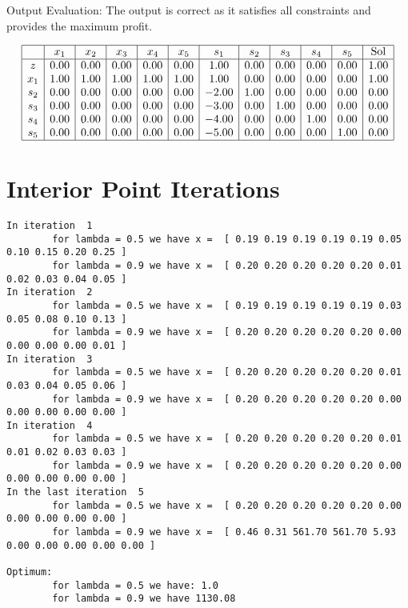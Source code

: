 \documentclass[12pt, legalpaper]{exam}
\begin{document}
Output Evaluation:
The output is correct as it satisfies all constraints and provides the maximum profit.
 
\[
\begin{array}{|c|c|c|c|c|c|c|c|c|c|c|c|}
\hline
    & x_1 & x_2 & x_3 & x_4 & x_5 & s_1 & s_2 & s_3 & s_4 & s_5 & \text{Sol} \\
\hline
z   & 0.00 & 0.00 & 0.00 & 0.00 & 0.00 & 1.00 & 0.00 & 0.00 & 0.00 & 0.00 & 1.00 \\
x_1 & 1.00 & 1.00 & 1.00 & 1.00 & 1.00 & 1.00 & 0.00 & 0.00 & 0.00 & 0.00 & 1.00 \\
s_2 & 0.00 & 0.00 & 0.00 & 0.00 & 0.00 & -2.00 & 1.00 & 0.00 & 0.00 & 0.00 & 0.00 \\
s_3 & 0.00 & 0.00 & 0.00 & 0.00 & 0.00 & -3.00 & 0.00 & 1.00 & 0.00 & 0.00 & 0.00 \\
s_4 & 0.00 & 0.00 & 0.00 & 0.00 & 0.00 & -4.00 & 0.00 & 0.00 & 1.00 & 0.00 & 0.00 \\
s_5 & 0.00 & 0.00 & 0.00 & 0.00 & 0.00 & -5.00 & 0.00 & 0.00 & 0.00 & 1.00 & 0.00 \\
\hline
\end{array}
\]
 
\section*{Interior Point Iterations}
\small
\begin{verbatim}
In iteration  1 
        for lambda = 0.5 we have x =  [ 0.19 0.19 0.19 0.19 0.19 0.05 0.10 0.15 0.20 0.25 ] 
        for lambda = 0.9 we have x =  [ 0.20 0.20 0.20 0.20 0.20 0.01 0.02 0.03 0.04 0.05 ]
In iteration  2 
        for lambda = 0.5 we have x =  [ 0.19 0.19 0.19 0.19 0.19 0.03 0.05 0.08 0.10 0.13 ] 
        for lambda = 0.9 we have x =  [ 0.20 0.20 0.20 0.20 0.20 0.00 0.00 0.00 0.00 0.01 ]
In iteration  3 
        for lambda = 0.5 we have x =  [ 0.20 0.20 0.20 0.20 0.20 0.01 0.03 0.04 0.05 0.06 ] 
        for lambda = 0.9 we have x =  [ 0.20 0.20 0.20 0.20 0.20 0.00 0.00 0.00 0.00 0.00 ]
In iteration  4 
        for lambda = 0.5 we have x =  [ 0.20 0.20 0.20 0.20 0.20 0.01 0.01 0.02 0.03 0.03 ] 
        for lambda = 0.9 we have x =  [ 0.20 0.20 0.20 0.20 0.20 0.00 0.00 0.00 0.00 0.00 ]
In the last iteration  5 
        for lambda = 0.5 we have x =  [ 0.20 0.20 0.20 0.20 0.20 0.00 0.00 0.00 0.00 0.00 ] 
        for lambda = 0.9 we have x =  [ 0.46 0.31 561.70 561.70 5.93 0.00 0.00 0.00 0.00 0.00 ]
 
Optimum:
        for lambda = 0.5 we have: 1.0 
        for lambda = 0.9 we have 1130.08
\end{verbatim}
\normalsize
 
\end{document}
